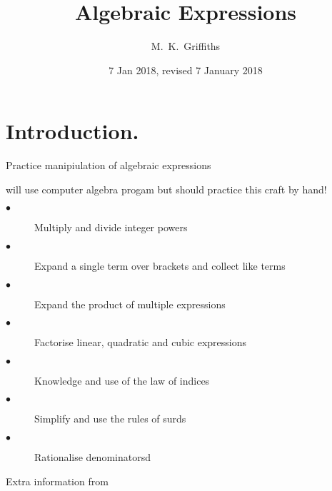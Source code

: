 \documentclass[11pt]{article}
\begin{document}
\title{Algebraic Expressions}
\author{M.~K.~Griffiths}
\date{7 Jan 2018, revised 7 January 2018}
\maketitle
\insert{}
\section{Introduction.}\label{S1}

Practice manipiulation of algebraic expressions

will use computer algebra progam but should practice this craft by hand!


\begin{description}
\item[$\bullet$] Multiply and divide integer powers
\item[$\bullet$] Expand a single term over brackets and collect like terms
\item[$\bullet$] Expand the product of multiple expressions
\item[$\bullet$] Factorise linear, quadratic and cubic expressions
\item[$\bullet$] Knowledge and use of the law of indices
\item[$\bullet$] Simplify and use the rules of surds
\item[$\bullet$] Rationalise denominatorsd
\end{description}

Extra information from \cite{khanacademyalgebra1}
\end{document}
